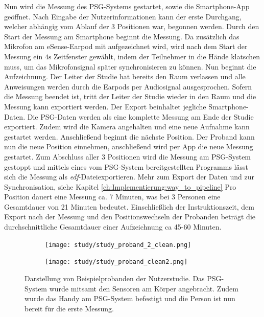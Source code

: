 Nun wird die Messung des PSG-Systems gestartet, sowie die Smartphone-App geöffnet. 
Nach Eingabe der Nutzerinformationen kann der erste Durchgang, welcher abhängig vom Ablauf der 3 Positionen war, begonnen werden.
Durch den Start der Messung am Smartphone beginnt die Messung. 
Da zusätzlich das Mikrofon am eSense-Earpod mit aufgezeichnet wird, wird nach dem Start der Messung ein $4\si{\s}$ Zeitfenster gewählt, indem der Teilnehmer in die Hände klatschen muss, um das Mikrofonsignal später synchronisieren zu können.
Nun beginnt die Aufzeichnung. Der Leiter der Studie hat bereits den Raum verlassen und alle Anweisungen werden durch die Earpods per Audiosignal ausgesprochen. 
Sofern die Messung beendet ist, tritt der Leiter der Studie wieder in den Raum und die Messung kann exportiert werden. 
Der Export beinhaltet jegliche Smartphone-Daten. Die PSG-Daten werden als eine komplette Messung am Ende der Studie exportiert.
Zudem wird die Kamera angehalten und eine neue Aufnahme kann gestartet werden.
Anschließend beginnt die nächste Position. Der Proband kann nun die neue Position einnehmen, anschließend wird per App die neue Messung gestartet.
Zum Abschluss aller 3 Positionen wird die Messung am PSG-System gestoppt und mittels eines vom PSG-System bereitgestellten Programms lässt sich die Messung als \glqq \textit{edf}-Datei\grqq exportieren.
Mehr zum Export der Daten und zur Synchronisation, siehe Kapitel \ref{ch:Implementierung:way_to_pipeline}
Pro Position dauert eine Messung ca. 7 Minuten, was bei 3 Personen eine Gesamtdauer von 21 Minuten bedeutet.
Einschließlich der Instruktionszeit, dem Export nach der Messung und den Positionswechseln der Probanden beträgt die durchschnittliche Gesamtdauer einer Aufzeichnung ca 45-60 Minuten. 

\begin{figure}[ht]
    \centering
    \begin{subfigure}{0.53\textwidth}
        \texttt{[image: study/study\_proband\_2\_clean.png]}
    \end{subfigure}
    \begin{subfigure}{0.3\textwidth}
        \texttt{[image: study/study\_proband\_clean2.png]}
    \end{subfigure}
    \caption{Darstellung von Beispielprobanden der Nutzerstudie. Das PSG-System wurde mitsamt den Sensoren am Körper angebracht. Zudem wurde das Handy am PSG-System befestigt und die Person ist nun bereit für die erste Messung.}
    \label{implementation:study:measurement_example}
\end{figure}